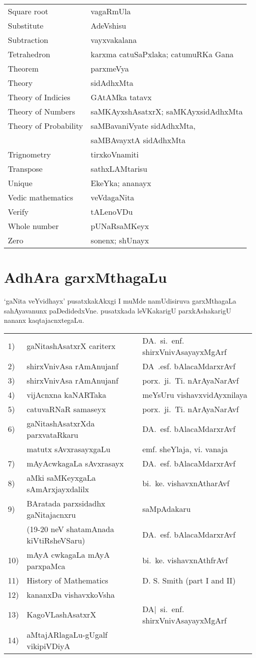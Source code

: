 {\begin{longtable}{>{\rm}l@{\hspace{1cm}}l}
Square root & vagaRmUla\\
Substitute & AdeVshisu\\
Subtraction & vayxvakalana\\
Tetrahedron & karxma catuSaPxlaka; catumuRKa Gana\\
Theorem & parxmeVya\\
Theory & sidAdhxMta\\
Theory of Indicies & GAtAMka tatavx\\
Theory of Numbers & saMKAyxshAsatxrX; saMKAyxsidAdhxMta\\
Theory of Probability & saMBavaniVyate sidAdhxMta,\\[-0.1cm] 
 &saMBAvayxtA sidAdhxMta\\
Trignometry & tirxkoVnamiti\\
Transpose & sathxLAMtarisu\\
Unique & EkeYka; ananayx\\
Vedic mathematics & veVdagaNita\\
Verify & tALenoVDu\\
Whole number & pUNaRsaMKeyx\\
Zero & sonenx; shUnayx
\end{longtable}

\newpage
\section*{AdhAra garxMthagaLu}

`gaNita veYvidhayx' pusatxkakAkxgi I muMde namUdisiruva garxMthagaLa sahAyavanunx paDedidedxVne. pusatxkada leVKakarigU parxkAshakarigU nananx kaqtajacnxtegaLu.

\begin{longtable}{l>{\raggedright}p{4cm}>{\raggedright}p{4cm}}
{\rm 1)} &  gaNitashAsatxrX cariterx & DA.~si.~enf. shirxVnivAsayayxMgArf \tabularnewline
{\rm 2)} & shirxVnivAsa rAmAnujanf & DA~.esf. bAlacaMdarxrAvf\tabularnewline
{\rm 3)} & shirxVnivAsa rAmAnujanf & porx.~ji.~Ti. nArAyaNarAvf\tabularnewline
{\rm 4)} & vijAcnxna kaNARTaka & meYsUru vishavxvidAyxnilaya\tabularnewline
{\rm 5)} & catuvaRNaR samaseyx & porx.~ji.~Ti. nArAyaNarAvf\tabularnewline
{\rm 6)} & gaNitashAsatxrXda parxvataRkaru & DA.~esf. bAlacaMdarxrAvf\tabularnewline[-0.1cm]
& matutx sAvxrasayxgaLu & emf. sheYlaja, vi. vanaja\tabularnewline
{\rm 7)} & mAyAcwkagaLa sAvxrasayx & DA.~esf. bAlacaMdarxrAvf\tabularnewline
{\rm 8)} & aMki saMKeyxgaLa sAmArxjayxdalilx & bi.~ke. vishavxnAtharAvf\tabularnewline
{\rm 9)} & BAratada parxsidadhx gaNitajacnxru  & saMpAdakaru \tabularnewline[-0.1cm]
& ({\rm 19-20} neV shatamAnada kiVtiRsheVSaru) & DA.~esf. bAlacaMdarxrAvf\tabularnewline
{\rm 10)} & mAyA cwkagaLa mAyA parxpaMca & bi.~ke. vishavxnAthfrAvf\tabularnewline
{\rm 11)} & {\rm History of Mathematics} & {\rm D. S. Smith (part I and II)}\tabularnewline[-0.1cm]
{\rm 12)} & kananxDa vishavxkoVsha &\tabularnewline
{\rm 13)} & KagoVLashAsatxrX & DA|~si.~enf. shirxVnivAsayayxMgArf\tabularnewline
{\rm 14)} & aMtajARlagaLu-gUgalf vikipiVDiyA &\tabularnewline
\end{longtable}

}
